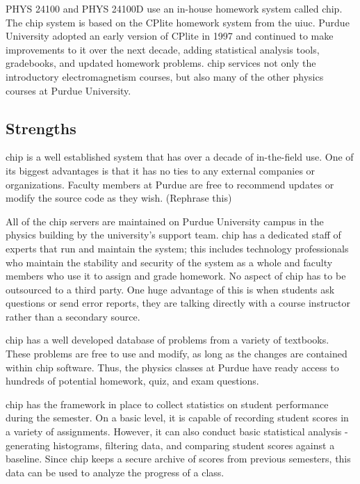 PHYS 24100 and PHYS 24100D use an in-house homework system called \gls{chip}. The \gls{chip} system is based on the CPlite homework system from the \gls{uiuc}. Purdue University adopted an early version of CPlite in 1997 and continued to make improvements to it over the next decade, adding statistical analysis tools, gradebooks, and updated homework problems. \gls{chip} services not only the introductory electromagnetism courses, but also many of the other physics courses at Purdue University.


\subsection*{Strengths}

\gls{chip} is a well established system that has over a decade of in-the-field use. One of its biggest advantages is that it has no ties to any external companies or organizations. Faculty members at Purdue are free to recommend updates or modify the source code as they wish. (Rephrase this)

All of the \gls{chip} servers are maintained on Purdue University campus in the physics building by the university's support team. \gls{chip} has a dedicated staff of experts that run and maintain the system; this includes technology professionals who maintain the stability and security of the system as a whole and faculty members who use it to assign and grade homework. No aspect of \gls{chip} has to be outsourced to a third party. One huge advantage of this is when students ask questions or send error reports, they are talking directly with a course instructor rather than a secondary source.

\gls{chip} has a well developed database of problems from a variety of textbooks. These problems are free to use and modify, as long as the changes are contained within \gls{chip} software. Thus, the physics classes at Purdue have ready access to hundreds of potential homework, quiz, and exam questions.

\gls{chip} has the framework in place to collect statistics on student performance during the semester. On a basic level, it is capable of recording student scores in a variety of assignments. However, it can also conduct basic statistical analysis - generating histograms, filtering data, and comparing student scores against a baseline. Since \gls{chip} keeps a secure archive of scores from previous semesters, this data can be used to analyze the progress of a class.

